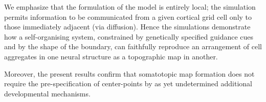\documentclass[9pt,twocolumn,twoside,lineno]{pnas-new}
\begin{document}
We emphasize that the formulation of the model is entirely local; the
simulation permits information to be communicated from a given cortical grid
cell only to those immediately adjacent (via diffusion). Hence the simulations
demonstrate how a self-organising system, constrained by genetically specified
guidance cues and by the shape of the boundary, can faithfully reproduce an
arrangement of cell aggregates in one neural structure as a topographic map in
another.

Moreover, the present results confirm that somatotopic map formation does not
require the pre-specification of center-points by as yet undetermined
additional developmental mechanisms.


\showacknow{} %


\end{document}
